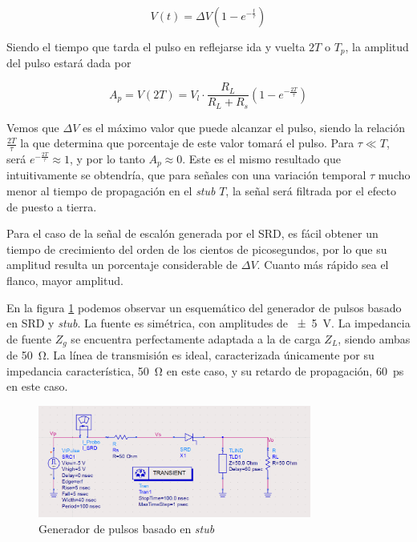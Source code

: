 \begin{equation}
  V(t) = \Delta V \left( 1-e^{-\frac{t}{\tau}}\right)
\end{equation}

Siendo el tiempo que tarda el pulso en reflejarse ida y vuelta $2T$ o $T_p$, la
amplitud del pulso estará dada por

\begin{equation}
    \label{eq:A_p}
    A_p = V(2T) = V_l \cdot \frac{R_L}{R_L+R_s} \left( 1-e^{-\frac{2T}{\tau}}\right)
\end{equation}

Vemos que $\Delta V$ es el máximo valor que puede alcanzar el pulso, siendo la
relación $\frac{2T}{\tau}$ la que determina que porcentaje de este valor tomará
el pulso. Para $ \tau \ll T $, será $e^{-\frac{2T}{\tau}} \approx 1$, y por lo
tanto $A_p \approx 0$. Este es el mismo resultado que intuitivamente se
obtendría, que para señales con una variación temporal $\tau$ mucho menor al
tiempo de propagación en el \textit{stub} $T$, la señal será filtrada por el
efecto de puesto a tierra.

Para el caso de la señal de escalón generada por el SRD, es fácil obtener un
tiempo de crecimiento del orden de los cientos de picosegundos, por lo que su
amplitud resulta un porcentaje considerable de $\Delta V$. Cuanto más rápido sea
el flanco, mayor amplitud.

En la figura \ref{fig:stub_generator_circuit} podemos observar un esquemático
del generador de pulsos basado en SRD y \textit{stub}. La fuente es simétrica,
con amplitudes de \qty{\pm 5}{\volt}. La impedancia de fuente $Z_g$ se encuentra
perfectamente adaptada a la de carga $Z_L$, siendo ambas de \qty{50}{\ohm}. La
línea de transmisión es ideal, caracterizada únicamente por su impedancia
característica, \qty{50}{\ohm} en este caso, y su retardo de propagación,
\qty{60}{\pico\second} en este caso.

\begin{figure}[tbp]
    \centering
    \includegraphics[width=0.8\textwidth]{images/stub_generator_circuit.png}
    \caption{Generador de pulsos basado en \textit{stub}}
    \label{fig:stub_generator_circuit}
\end{figure}

